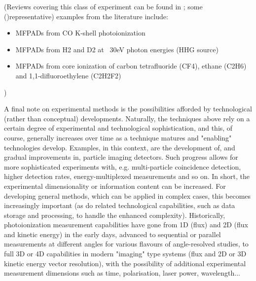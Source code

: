 (Reviews covering this class of experiment can be found in  \cite{Yagishita2005,Reid2012,Yagishita2015}; some ()representative) examples from the literature include:
\begin{itemize}
\item MFPADs from CO K-shell photoionization \cite{motoki2000KshellPhotoionizationCO}
\item MFPADs from H2 and D2 at ~30eV photon energies (HHG source) \cite{Billaud2012a}
\item MFPADs from core ionization of carbon tetrafluoride (CF4), ethane (C2H6) and 1,1-difluoroethylene (C2H2F2)\cite{Menssen2016}
\end{itemize}

)

A final note on experimental methods is the possibilities afforded by technological (rather than conceptual) developments. Naturally, the techniques above rely on a certain degree of experimental and technological sophistication, and this, of course, generally increases over time as a technique matures and "enabling" technologies develop. Examples, in this context, are the development of, and gradual improvements in, particle imaging detectors. Such progress allows for more sophisticated experiments with, e.g. multi-particle coincidence detection, higher detection rates, energy-multiplexed measurements and so on. In short, the experimental dimensionality or information content can be increased. For developing general methods, which can be applied in complex cases, this becomes increasingly important (as do related technological capabilities, such as data storage and processing, to handle the enhanced complexity). Historically, photoionization measurement capabilities have gone from 1D (flux) and 2D (flux and kinetic energy) in the early days, advanced to sequential or parallel measurements at different angles for various flavours of angle-resolved studies, to full 3D or 4D capabilities in modern "imaging" type systems (flux and 2D or 3D kinetic energy vector resolution), with the possibility of additional experimental measurement dimensions such as time, polarisation, laser power, wavelength...